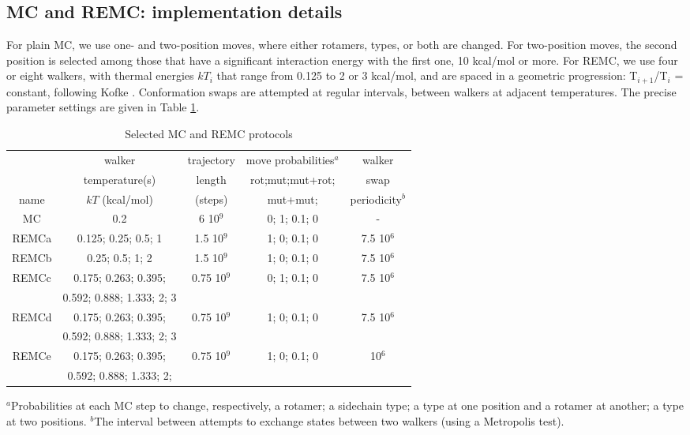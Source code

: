 \subsection{MC and REMC: implementation details}
For plain MC, we use one- and two-position moves, where either rotamers, types, or both are changed. For two-position
moves, the second position is selected among those that have a significant interaction energy with the first
one, 10 kcal/mol or more. For REMC, we use four or eight walkers, with thermal energies $kT_i$ that range from 0.125
to 2 or 3 kcal/mol, and are spaced in a geometric progression: T$_{i+1}$/T$_i$ = constant, following Kofke \cite{Kofke02}.
Conformation swaps are attempted at regular intervals, between walkers at adjacent temperatures. The precise parameter
settings are given in Table \ref{tab:parameters}.

\begin{table}[H]                            
\caption{Selected MC and REMC protocols}
\label{tab:parameters}                      
\begin{center} \small 
\renewcommand{\arraystretch}{0.75}
\begin{tabular}{ccccc} \hline \hline  
      &  walker                   & trajectory & move probabilities$^a$ & walker     \\ 
      &  temperature(s)           & length     & rot;mut;mut+rot; & swap       \\ 
name  & $kT$ (kcal/mol)           & (steps)    & mut+mut;         & periodicity$^b$ \smallskip \\  \hline 
MC    & 0.2                       &   6 10$^9$ & 0; 1; 0.1; 0     &  -          \smallskip \\      
REMCa & 0.125; 0.25; 0.5; 1       & 1.5 10$^9$ & 1; 0; 0.1; 0     & 7.5 10$^6$  \smallskip \\   
REMCb & 0.25; 0.5; 1; 2           & 1.5 10$^9$ & 1; 0; 0.1; 0     & 7.5 10$^6$  \smallskip \\ 
REMCc & 0.175; 0.263; 0.395;      & 0.75 10$^9$& 0; 1; 0.1; 0     & 7.5 10$^6$  \\
      & 0.592; 0.888; 1.333; 2; 3 &  &  &  \smallskip \\
REMCd & 0.175; 0.263; 0.395;      &0.75 10$^9$ & 1; 0; 0.1; 0     & 7.5 10$^6$  \\
      & 0.592; 0.888; 1.333; 2; 3 &  &  &  \smallskip \\
REMCe & 0.175; 0.263; 0.395;      &0.75 10$^9$ & 1; 0; 0.1; 0     &     10$^6$  \\ 
      & 0.592; 0.888; 1.333; 2;   &  &  &  \smallskip \\ \hline
\end{tabular}
\end{center}
{\small \noindent $^a$Probabilities at each MC step to change, respectively, a
rotamer; a sidechain type; a type at one position and a rotamer at another;
a type at two positions. $^b$The interval between attempts to exchange states
between two walkers (using a Metropolis test).
}
\end{table}








